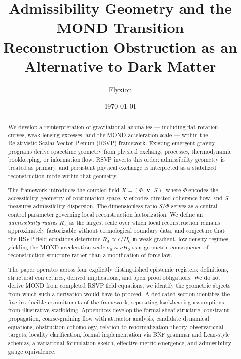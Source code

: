 \documentclass[11pt, a4paper]{article}
\title{%
  \textbf{Admissibility Geometry and the MOND Transition}\\[0.4em]
  \large Reconstruction Obstruction as an Alternative to Dark Matter
}
\author{Flyxion}
\date{\today}
\theoremstyle{plain}
\theoremstyle{definition}
\theoremstyle{remark}
\newcommand{\Xfield}{X = (\Phi,\,\mathbf{v},\,S)}
\newcommand{\RA}{R_{\!A}}
\begin{document}

\maketitle
\thispagestyle{empty}

\begin{abstract}
\noindent
We develop a reinterpretation of gravitational anomalies --- including flat rotation
curves, weak lensing excesses, and the MOND acceleration scale --- within the
Relativistic Scalar-Vector Plenum (RSVP) framework. Existing emergent gravity
programs derive spacetime geometry from physical exchange processes, thermodynamic
bookkeeping, or information flow. RSVP inverts this order: admissibility geometry
is treated as primary, and persistent physical exchange is interpreted as a
stabilized reconstruction mode within that geometry.

The framework introduces the coupled field $\Xfield$, where $\Phi$ encodes the
accessibility geometry of continuation space, $\mathbf{v}$ encodes directed
coherence flow, and $S$ measures admissibility dispersion. The dimensionless ratio
$S/\Phi$ serves as a central control parameter governing local reconstruction
factorization. We define an \emph{admissibility radius} $\RA$ as the largest scale
over which local reconstruction remains approximately factorizable without
cosmological boundary data, and conjecture that the RSVP field equations determine
$\RA \propto c/H_0$ in weak-gradient, low-density regimes, yielding the MOND
acceleration scale $a_0 \sim cH_0$ as a geometric consequence of reconstruction
structure rather than a modification of force law.

The paper operates across four explicitly distinguished epistemic registers:
definitions, structural conjectures, derived implications, and open proof
obligations. We do not derive MOND from completed RSVP field equations; we identify
the geometric objects from which such a derivation would have to proceed. A dedicated
section identifies the five irreducible commitments of the framework, separating
load-bearing assumptions from illustrative scaffolding. Appendices
develop the formal sheaf structure, constraint propagation, coarse-graining flow with
attractor analysis, candidate dynamical equations, obstruction cohomology, relation
to renormalization theory, observational targets, locality clarification, formal
implementation via BNF grammar and Lean-style schemas, a variational formulation
sketch, effective metric emergence, and admissibility gauge equivalence.
\end{abstract}
\end{document}
